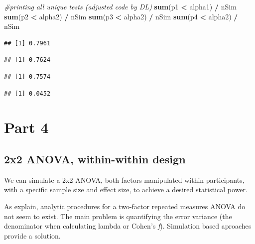 \documentclass[
]{book}
\newenvironment{Shaded}{\begin{snugshade}}{\end{snugshade}}
\newcommand{\CommentTok}[1]{\textcolor[rgb]{0.56,0.35,0.01}{\textit{#1}}}
\newcommand{\KeywordTok}[1]{\textcolor[rgb]{0.13,0.29,0.53}{\textbf{#1}}}
\newcommand{\NormalTok}[1]{#1}
\newcommand{\OperatorTok}[1]{\textcolor[rgb]{0.81,0.36,0.00}{\textbf{#1}}}
\newcommand{\StringTok}[1]{\textcolor[rgb]{0.31,0.60,0.02}{#1}}
\begin{document}
\begin{Shaded}
\begin{Highlighting}[]
\CommentTok{#printing all unique tests (adjusted code by DL)}
\KeywordTok{sum}\NormalTok{(p1 }\OperatorTok{<}\StringTok{ }\NormalTok{alpha1) }\OperatorTok{/}\StringTok{ }\NormalTok{nSim}
\KeywordTok{sum}\NormalTok{(p2 }\OperatorTok{<}\StringTok{ }\NormalTok{alpha2) }\OperatorTok{/}\StringTok{ }\NormalTok{nSim}
\KeywordTok{sum}\NormalTok{(p3 }\OperatorTok{<}\StringTok{ }\NormalTok{alpha2) }\OperatorTok{/}\StringTok{ }\NormalTok{nSim}
\KeywordTok{sum}\NormalTok{(p4 }\OperatorTok{<}\StringTok{ }\NormalTok{alpha2) }\OperatorTok{/}\StringTok{ }\NormalTok{nSim}
\end{Highlighting}
\end{Shaded}

\begin{verbatim}
## [1] 0.7961
\end{verbatim}

\begin{verbatim}
## [1] 0.7624
\end{verbatim}

\begin{verbatim}
## [1] 0.7574
\end{verbatim}

\begin{verbatim}
## [1] 0.0452
\end{verbatim}

\newpage

\hypertarget{part-4}{%
\section{Part 4}\label{part-4}}

\hypertarget{x2-anova-within-within-design}{%
\subsection{2x2 ANOVA, within-within design}\label{x2-anova-within-within-design}}

We can simulate a 2x2 ANOVA, both factors manipulated within participants, with a specific sample size and effect size, to achieve a desired statistical power.

As \citet{potvin2000statistical} explain, analytic procedures for a two-factor repeated measures ANOVA do not seem to exist. The main problem is quantifying the error variance (the denominator when calculating lambda or Cohen's \emph{f}). Simulation based aproaches provide a solution.
\end{document}
